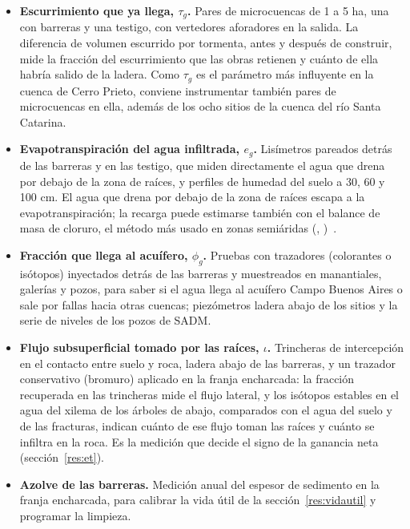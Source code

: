 \documentclass[11pt,letterpaper]{article}
\makeatletter
\newcommand{\citap}[1]{(\@nameuse{cautor@#1}, \@nameuse{canio@#1})~\cite{#1}}
\makeatother
\begin{document}
\begin{itemize}
  \item \textbf{Escurrimiento que ya llega, $\tau_g$.} Pares de microcuencas de 1 a 5 ha, una con barreras y una testigo, con vertedores aforadores en la salida. La diferencia de volumen escurrido por tormenta, antes y después de construir, mide la fracción del escurrimiento que las obras retienen y cuánto de ella habría salido de la ladera. Como $\tau_g$ es el parámetro más influyente en la cuenca de Cerro Prieto, conviene instrumentar también pares de microcuencas en ella, además de los ocho sitios de la cuenca del río Santa Catarina.
  \item \textbf{Evapotranspiración del agua infiltrada, $e_g$.} Lisímetros pareados detrás de las barreras y en las testigo, que miden directamente el agua que drena por debajo de la zona de raíces, y perfiles de humedad del suelo a 30, 60 y 100 cm. El agua que drena por debajo de la zona de raíces escapa a la evapotranspiración; la recarga puede estimarse también con el balance de masa de cloruro, el método más usado en zonas semiáridas \citap{scanlon2006}.
  \item \textbf{Fracción que llega al acuífero, $\phi_g$.} Pruebas con trazadores (colorantes o isótopos) inyectados detrás de las barreras y muestreados en manantiales, galerías y pozos, para saber si el agua llega al acuífero Campo Buenos Aires o sale por fallas hacia otras cuencas; piezómetros ladera abajo de los sitios y la serie de niveles de los pozos de SADM.
  \item \textbf{Flujo subsuperficial tomado por las raíces, $\iota$.} Trincheras de intercepción en el contacto entre suelo y roca, ladera abajo de las barreras, y un trazador conservativo (bromuro) aplicado en la franja encharcada: la fracción recuperada en las trincheras mide el flujo lateral, y los isótopos estables en el agua del xilema de los árboles de abajo, comparados con el agua del suelo y de las fracturas, indican cuánto de ese flujo toman las raíces y cuánto se infiltra en la roca. Es la medición que decide el signo de la ganancia neta (sección~\ref{res:et}).
  \item \textbf{Azolve de las barreras.} Medición anual del espesor de sedimento en la franja encharcada, para calibrar la vida útil de la sección~\ref{res:vidautil} y programar la limpieza.
\end{itemize}
\end{document}
